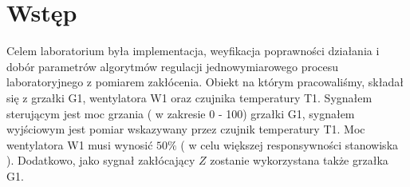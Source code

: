 \chapter{Wstęp}
Celem laboratorium była implementacja, weyfikacja poprawności działania i dobór
parametrów algorytmów regulacji jednowymiarowego procesu laboratoryjnego
z pomiarem zakłócenia. Obiekt na którym pracowaliśmy, składał się z grzałki G1,
wentylatora W1 oraz czujnika temperatury T1. Sygnałem sterującym jest moc grzania ( w zakresie 0 - 100)
grzałki G1, sygnałem wyjściowym jest pomiar wskazywany przez czujnik temperatury T1.
Moc wentylatora W1 musi wynosić $50\%$ ( w celu większej responsywności stanowiska ).
Dodatkowo, jako sygnał zakłócający $Z$ zostanie wykorzystana także grzałka G1. 
